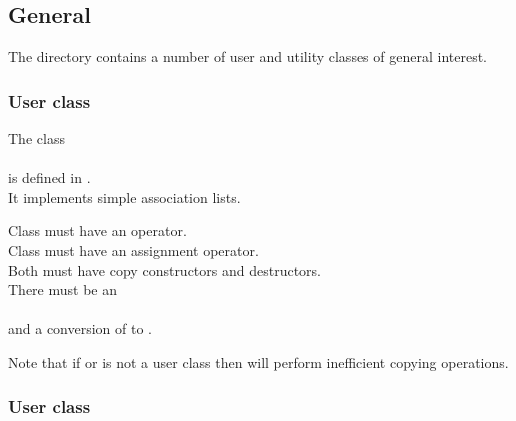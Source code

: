 \vspace{20pt}


\vspace{20pt}




\subsection{General}

The directory  contains a number of user
and utility classes of general interest.



\subsubsection{User class }


\noindent The class\\
\\
is defined in .\\
It implements simple association lists.



\noindent Class  must have an \code{==} operator.\\
Class  must have an assignment operator.\\
Both must have copy constructors and destructors.\\
There must be an\\
\\
and a conversion of  to .

\noindent Note that if  or  is not a user class then
 will perform inefficient copying operations.


\subsubsection{User class }

